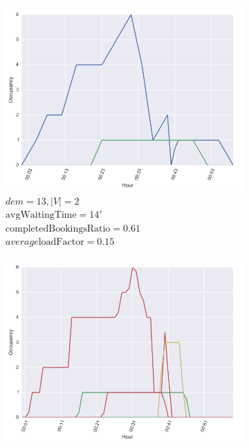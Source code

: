 \documentclass[12pt,a4paper]{article}
\begin{document}
\begin{figure}[]
\caption{Average occupancy of each vehicles at each minute of the simulated hour for the combinations of $V^{-}, V^{+}, dem^{-}$ and $dem^{+}$.}
  \centering
\begin{subfigure}[b]{0.48\textwidth}
  \includegraphics[width=\linewidth]{./images/dem13v2}
  \caption{$dem = 13, |V| = 2$\\ $\text{avgWaitingTime} = 14'$\\ $\text{completedBookingsRatio} = 0.61$ \\ $average\text{loadFactor} = 0.15$}
  \label{dem13v2}
\end{subfigure}
\begin{subfigure}[b]{0.48\textwidth}
  \includegraphics[width=\linewidth]{./images/dem13v10}

\end{subfigure}
\end{figure}
\end{document}
